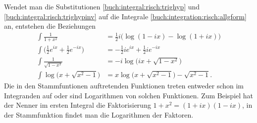 Wendet man die Substitutionen
\eqref{buch:integral:risch:trighyp}
und
\eqref{buch:integral:risch:trighypinv}
auf die Integrale
\eqref{buch:integration:risch:allgform}
an, entstehen die Beziehungen
\begin{equation}
\begin{aligned}
\int\frac{1}{1+x^2}
&=
\frac12i\bigl(
\log(1-ix) - \log(1+ix)
\bigr)
\\
\int\bigl(
{\textstyle\frac12}
e^{ix}
+
{\textstyle\frac12}
e^{-ix}
\bigr)
&=
-{\textstyle\frac12}ie^{ix}
+{\textstyle\frac12}ie^{-ix}
\\
\int
\frac{1}{\sqrt{1-x^2}}
&=
-i\log\bigl(ix+\sqrt{1-x^2})
\\
\int \log\bigl(x+\sqrt{x^2-1}\bigr)
&=
x\log\bigl(x+\sqrt{x^2-1}\bigr) - \sqrt{x^2-1}.
\end{aligned}
\label{buch:integration:risch:eqn:integralbeispiel2}
\end{equation}
Die in den Stammfuntionen auftretenden Funktionen treten entweder
schon im Integranden auf oder sind Logarithmen von solchen
Funktionen.
Zum Beispiel hat der Nenner im ersten Integral die Faktorisierung
$1+x^2=(1+ix)(1-ix)$, in der Stammfunktion findet man die Logarithmen
der Faktoren.


